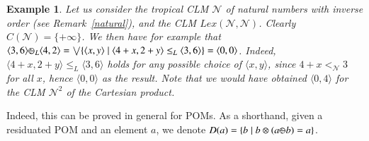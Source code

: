 \documentclass[a4paper]{elsarticle}
\newtheorem{example}{Example}
\newcommand{\1}{\mathbf{1}}
\def\odiv{{ \ominus\hspace{-8pt}:}\;}
\begin{document}
\begin{example}
	Let us consider the tropical CLM $\mathcal{N}$ of natural numbers with inverse order 
	(see Remark~\ref{natural}),
	and the CLM $Lex(\mathcal{N},\mathcal{N})$. Clearly $C(\mathcal{N}) = \{+\infty\}$. We then have for example
	that
	$\langle 3, 6 \rangle \odiv_L \langle 4, 2 \rangle = \bigvee \{\langle x, y \rangle \mid \langle 4 + x, 2 + y \rangle \leq_L \langle 3, 6 \rangle\} = \langle 0,0 \rangle$.
	Indeed, $\langle 4 + x, 2 + y \rangle \leq_L \langle 3, 6 \rangle$ holds for any possible choice of $\langle x, y \rangle$,
	since $4 + x <_\mathcal{N} 3$ for all $x$, hence $\langle 0,0 \rangle$ as the result.
	Note that we would have obtained $\langle 0, 4 \rangle$ for the CLM $\mathcal{N}^2$ of the Cartesian product.
\end{example}

Indeed, this can be proved in general for POMs. As a shorthand, given a residuated POM 
and an element $a$, we denote $D(a) = \{ b \mid b \otimes (a \odiv b) = a\}$.
\end{document}
